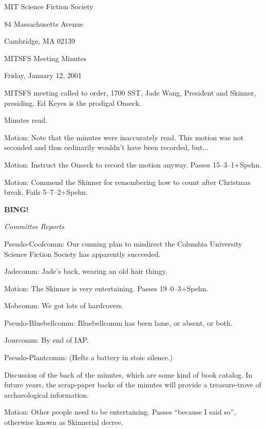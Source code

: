 \documentclass[12pt]{article}
\newcommand{\bing}{{\bf BING!} }
\newcommand{\goto}[1]{\bing \vskip 12pt \centerline{{\em{#1}}}}
\begin{document}
\begin{center}

MIT Science Fiction Society 

84 Massachusetts Avenue

Cambridge, MA 02139

\vspace{12pt}

MITSFS Meeting Minutes 

Friday, January 12, 2001

\end{center}
 
\vspace{18pt}

\setlength{\parskip}{6pt}

\noindent
MITSFS meeting called to order, 1700 SST, Jade Wang, President and
Skinner, presiding.  Ed Keyes is the prodigal Onseck.

Minutes read.

Motion: Note that the minutes were inaccurately read.  This motion was
not seconded and thus ordinarily wouldn't have been recorded, but...

Motion: Instruct the Onseck to record the motion anyway.  Passes
15--3--1+Spehn.

Motion: Commend the Skinner for remembering how to count after
Christmas break.  Fails 5--7--2+Spehn.

\goto{Committee Reports}

Pseudo-Coofcomm: Our cunning plan to misdirect the Columbia University
Science Fiction Society has apparently succeeded.

Jadecomm: Jade's back, wearing an old hair thingy.

Motion: The Skinner is very entertaining.  Passes 19--0--3+Spehn.

Mobcomm: We got lots of hardcovers.

Pseudo-Bluebellcomm: Bluebellcomm has been lame, or absent, or both.

Jourcomm: By end of IAP.

Pseudo-Plantcomm: (Hefts a battery in stoic silence.)

Discussion of the back of the minutes, which are some kind of book
catalog.  In future years, the scrap-paper backs of the minutes will
provide a treasure-trove of archaeological information.

Motion: Other people need to be entertaining.  Passes ``because I
said so'', otherwise known as Skinnerial decree.
\end{document}
